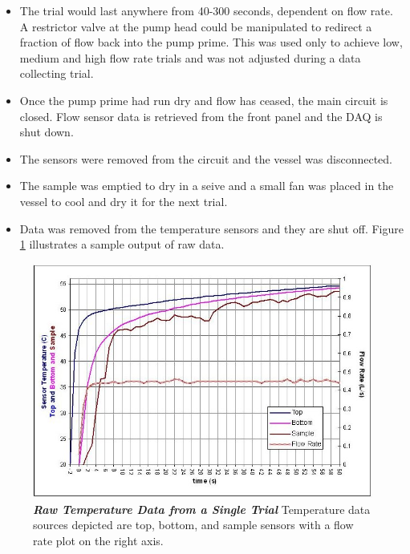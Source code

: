 \begin{itemize}
 \item The trial would last anywhere from 40-300 seconds, dependent on flow rate. A restrictor valve at the pump head could be manipulated to redirect a fraction of flow back into the pump prime. This was used only to achieve low, medium and high flow rate trials and was not adjusted during a data collecting trial.
 \item Once the pump prime had run dry and flow has ceased, the main circuit is closed. Flow sensor data is retrieved from the front panel and the DAQ is shut down.
 \item The sensors were removed from the circuit and the vessel was disconnected.
 \item The sample was emptied to dry in a seive and a small fan was placed in the vessel to cool and dry it for the next trial.
 \item Data was removed from the temperature sensors and they are shut off. Figure \ref{rawTemps} illustrates a sample output of raw data.
\end{itemize}
\begin{landscape}
\begin{figure}
\begin{center}
\includegraphics[scale=.65]{rawTemps.JPG}
\caption[Raw Temperature Plot]{\textbf{\emph{Raw Temperature Data from a Single Trial}} Temperature data sources depicted are top, bottom, and sample sensors with a flow rate plot on the right axis.\label{rawTemps}}
\end{center}
\end{figure}
\end{landscape}

